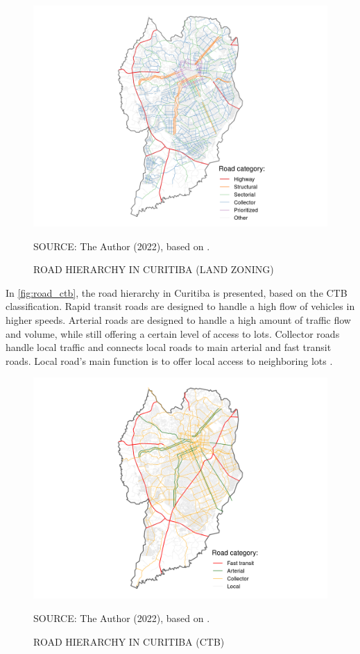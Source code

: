 \begin{figure}[!htbp]
    \centering\footnotesize
    \captionsetup{font=footnotesize}
    \caption{ROAD HIERARCHY IN CURITIBA (LAND ZONING)}
    \includegraphics{fig/road_zoning_map.png}
    \label{fig:road_cwb}
    \par SOURCE: The Author (2022), based on \textcite{IPPUC2021}.
\end{figure}

In \autoref{fig:road_ctb}, the road hierarchy in Curitiba is presented, based on the CTB classification. Rapid transit roads are designed to handle a high flow of vehicles in higher speeds. Arterial roads are designed to handle a high amount of traffic flow and volume, while still offering a certain level of access to lots. Collector roads handle local traffic and connects local roads to main arterial and fast transit roads. Local road's main function is to offer local access to neighboring lots \cite{Brasil1997}. 

\begin{figure}[!htbp]
    \centering\footnotesize
    \captionsetup{font=footnotesize}
    \caption{ROAD HIERARCHY IN CURITIBA (CTB)}
    \includegraphics{fig/road_ctb.png}
    \label{fig:road_ctb}
    \par SOURCE: The Author (2022), based on \textcite{IPPUC2021}.
\end{figure}

